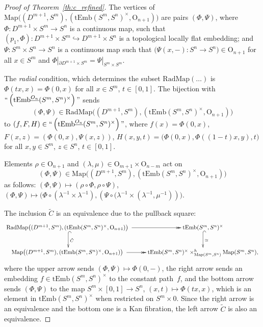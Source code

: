 \documentclass[11pt]{amsart}
\theoremstyle{definition}
\newcommand{\tEmb}{\mathrm{tEmb}}
\newcommand{\Map}{\mathrm{Map}}
\newcommand{\OO}{\mathrm{O}}
\numberwithin{equation}{section}
\begin{document}
\begin{proof}[Proof of Theorem~\ref{th:c_refined}]
The vertices of $\Map\bigl( (D^{m+1},S^m),(\tEmb(S^m,S^n)^\times,\OO_{n+1})\bigr)$ are pairs $(\Phi,\Psi)$, where $\Phi\colon D^{m+1}\times S^m\to S^n$ is a continuous map, such that 
$(p_1,\Phi)\colon D^{m+1}\times S^m\hookrightarrow D^{m+1}\times S^n$ is a topological locally flat embedding; and $\Psi\colon S^m\times S^n\to S^n$ is a continuous map such that 
$\bigl(\Psi(x,-)\colon S^n\to S^n\bigr)\in\OO_{n+1}$ for all $x\in S^m$ and $\Phi|_{\partial D^{m+1}\times S^m}=\Psi|_{S^m\times S^m}$.

The {\it radial} condition, which determines the subset $\mathrm{RadMap}(\ldots)$ is $\Phi(tx,x)=\Phi(0,x)$ for all $x\in S^m$, $t\in[0,1]$. The bijection with  
$\text{\lq\lq{}}\left(\tEmb^{\underline{O_n}}(S^m,S^n)^\times\right)\text{\rq\rq{}}$  sends 
$$(\Phi,\Psi)\in{\mathrm{RadMap}}\bigl( (D^{m+1},S^m),(\tEmb(S^m,S^n)^\times,\OO_{n+1})\bigr)$$         
to $(f,F,H)\in \text{\lq\lq{}}\left(\tEmb^{\underline{O_n}}(S^m,S^n)^\times\right)\text{\rq\rq{}}$, where $f(x)=\Phi(0,x)$, $F(x,z)=(\Phi(0,x),\Psi(x,z))$, $H(x,y,t)=\bigl(\Phi(0,x),\Phi((1-t)x,y),t\bigr)$ for 
all $x,y\in S^m$, $z\in S^n$, $t\in[0,1]$.

Elements $\rho\in \OO_{n+1}$ and $(\lambda,\mu)\in\OO_{m+1}\times\OO_{n-m}$ act on 
$$(\Phi,\Psi)\in\Map\bigl( (D^{m+1},S^m),(\tEmb(S^m,S^n)^\times,\OO_{n+1})\bigr)$$ 
as follows:
$(\Phi,\Psi)\mapsto (\rho\circ\Phi,\rho\circ\Psi)$, $(\Phi,\Psi)\mapsto \bigl(\Phi\circ \left(\lambda^{-1}\times\lambda^{-1}\right),\left(\Psi\circ (\lambda^{-1}\times (\lambda^{-1},\mu^{-1})\right)\bigr)$.


The inclusion $\tilde C$ is an equivalence due to the pullback square:
\begin{equation}\label{eq:embfr_sq6}
\xymatrix{
\mathrm{RadMap}\bigl( (D^{m+1},S^m),(\tEmb(S^m,S^n)^\times,\OO_{n+1})\bigr)\,\,\ar@{->>}[r]\ar@{^{(}->}[d]^{\tilde C}&\tEmb(S^m,S^n)^\times\ar@{^{(}->}[d]^\simeq\\
\Map\bigl( (D^{m+1},S^m),(\tEmb(S^m,S^n)^\times,\OO_{n+1})\bigr)\,\,\ar@{->>}[r]&\tEmb(S^m,S^n)^\times\times^h_{\Map(S^m,S^n)}\Map(S^m,S^n),
}
\end{equation}
where the upper arrow sends $(\Phi,\Psi)\mapsto\Phi(0,-)$, the right arrow sends an embedding $f\in \tEmb(S^m,S^n)^\times$ to the constant path~$f$, and the bottom arrow sends $(\Phi,\Psi)$ to the
map $S^m\times [0,1]\to S^n$, $(x,t)\mapsto \Phi(tx,x)$, which is an element in $\tEmb(S^m,S^n)^\times$ when restricted on $S^m\times 0$. Since the right arrow is an equivalence and the bottom one is a Kan fibration,
the left arrow $\tilde C$ is also an equivalence.


\end{proof}
\end{document}
